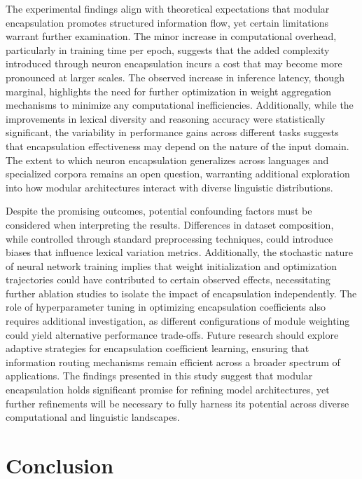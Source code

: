 \documentclass{article}
\begin{document}
The experimental findings align with theoretical expectations that modular encapsulation promotes structured information flow, yet certain limitations warrant further examination. The minor increase in computational overhead, particularly in training time per epoch, suggests that the added complexity introduced through neuron encapsulation incurs a cost that may become more pronounced at larger scales. The observed increase in inference latency, though marginal, highlights the need for further optimization in weight aggregation mechanisms to minimize any computational inefficiencies. Additionally, while the improvements in lexical diversity and reasoning accuracy were statistically significant, the variability in performance gains across different tasks suggests that encapsulation effectiveness may depend on the nature of the input domain. The extent to which neuron encapsulation generalizes across languages and specialized corpora remains an open question, warranting additional exploration into how modular architectures interact with diverse linguistic distributions.

Despite the promising outcomes, potential confounding factors must be considered when interpreting the results. Differences in dataset composition, while controlled through standard preprocessing techniques, could introduce biases that influence lexical variation metrics. Additionally, the stochastic nature of neural network training implies that weight initialization and optimization trajectories could have contributed to certain observed effects, necessitating further ablation studies to isolate the impact of encapsulation independently. The role of hyperparameter tuning in optimizing encapsulation coefficients also requires additional investigation, as different configurations of module weighting could yield alternative performance trade-offs. Future research should explore adaptive strategies for encapsulation coefficient learning, ensuring that information routing mechanisms remain efficient across a broader spectrum of applications. The findings presented in this study suggest that modular encapsulation holds significant promise for refining model architectures, yet further refinements will be necessary to fully harness its potential across diverse computational and linguistic landscapes.



\section{Conclusion}
\end{document}
